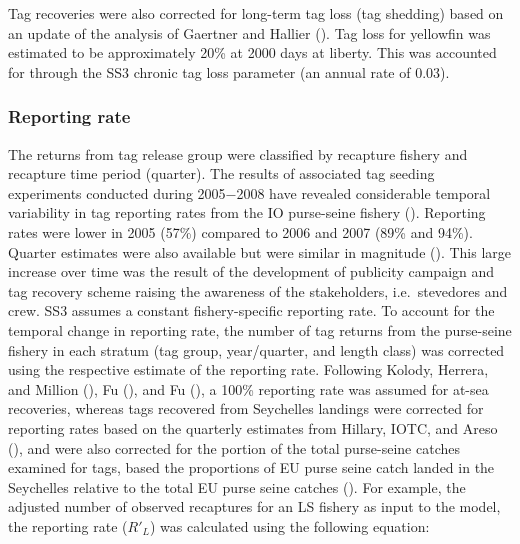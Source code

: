 \documentclass[
]{scrartcl}
\begin{document}
Tag recoveries were also corrected for long-term tag loss (tag shedding)
based on an update of the analysis of Gaertner and Hallier
(). Tag loss for
yellowfin was estimated to be approximately 20\% at 2000 days at
liberty. This was accounted for through the SS3 chronic tag loss
parameter (an annual rate of 0.03).

\subsubsection{Reporting rate}\label{reporting-rate}

The returns from tag release group were classified by recapture fishery
and recapture time period (quarter). The results of associated tag
seeding experiments conducted during 2005−2008 have revealed
considerable temporal variability in tag reporting rates from the IO
purse-seine fishery
().
Reporting rates were lower in 2005 (57\%) compared to 2006 and 2007
(89\% and 94\%). Quarter estimates were also available but were similar
in magnitude (). This large increase over time was the result of
the development of publicity campaign and tag recovery scheme raising
the awareness of the stakeholders, i.e.~stevedores and crew. SS3 assumes
a constant fishery-specific reporting rate. To account for the temporal
change in reporting rate, the number of tag returns from the purse-seine
fishery in each stratum (tag group, year/quarter, and length class) was
corrected using the respective estimate of the reporting rate. Following
Kolody, Herrera, and Million
(), Fu
(), and Fu
(), a 100\% reporting rate
was assumed for at-sea recoveries, whereas tags recovered from
Seychelles landings were corrected for reporting rates based on the
quarterly estimates from Hillary, IOTC, and Areso
(), and were also
corrected for the portion of the total purse-seine catches examined for
tags, based the proportions of EU purse seine catch landed in the
Seychelles relative to the total EU purse seine catches
(). For example, the adjusted number of observed recaptures
for an LS fishery as input to the model, the reporting rate (\(R'_L\))
was calculated using the following equation:
\end{document}
